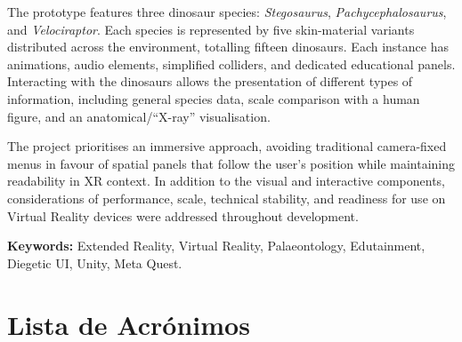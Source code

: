 \documentclass[a4paper,11pt]{report}
\newcommand{\blankpage}{%
    \newpage
    \thispagestyle{empty}
    \mbox{}
    \newpage
}
\begin{document}
The prototype features three dinosaur species: \textit{Stegosaurus},
\textit{Pachycephalosaurus}, and \textit{Velociraptor}. Each species is
represented by five skin-material variants distributed across the environment,
totalling fifteen dinosaurs. Each instance has animations, audio elements,
simplified colliders, and dedicated educational panels.
Interacting with the dinosaurs allows the presentation of different types of
information, including general species data, scale comparison with a human
figure, and an anatomical/``X-ray'' visualisation.

The project prioritises an immersive approach, avoiding traditional
camera-fixed menus in favour of spatial panels that follow the user's position
while maintaining readability in XR context. In addition to the visual and
interactive components, considerations of performance, scale, technical
stability, and readiness for use on Virtual Reality devices were addressed
throughout development.

\textbf{Keywords:} Extended Reality, Virtual Reality, Palaeontology,
Edutainment, Diegetic UI, Unity, Meta Quest.

\blankpage

\tableofcontents

\blankpage

\listoffigures
{}

\blankpage

\listoftables
{}

\blankpage

\lstlistoflistings
{}

\blankpage

\chapter*{Lista de Acrónimos}
\end{document}
